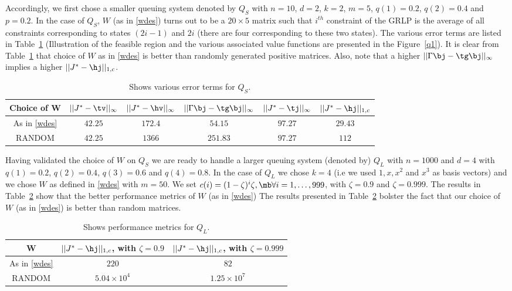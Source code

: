 Accordingly, we first chose a smaller queuing system denoted by $Q_S$ with $n=10$, $d=2$, $k=2$, $m=5$, $q(1)=0.2$, $q(2)=0.4$ and $p=0.2$. In the case of $Q_S$, $W$ (as in \eqref{wdes}) turns out to be a $20 \times 5$ matrix such that $i^{th}$ constraint of the GRLP is the average of all constraints corresponding to states $(2i -1)$ and $2i$ (there are four corresponding to these two states). The various error terms are listed in Table~\ref{errterms} (Illustration of the feasible region and the various associated value functions are presented in the Figure~\ref{q1}). It is clear from Table~\ref{errterms} that choice of $W$ as in \eqref{wdes} is better than randomly generated positive matrices. Also, note that a higher $||\Gamma\bj-\tg\bj||_\infty$ implies a higher $||J^*-\hj||_{1,c}$.
\FloatBarrier
\begin{table}[H]
\begin{tabular}{|c|c|c|c|c|c|}\hline
Choice of W &$||J^*-\tv||_\infty$	&$||J^*-\hv||_\infty$	&$||\Gamma\bj-\tg\bj||_\infty$	&$||J^*-\tj||_\infty$	&$||J^*-\hj||_{1,c}$\\\hline
As in \eqref{wdes}&	$42.25$&	$172.4$&	$54.15$&	$97.27$&		$29.43$\\\hline
RANDOM&	$42.25$&	$1366$&		$251.83$&	$97.27$&	$112$\\\hline
\end{tabular}
\caption{Shows various error terms for $Q_S$.} %
\label{errterms}
\end{table}

\vspace{-10pt}
Having validated the choice of $W$ on $Q_S$ we are ready to handle a larger queuing system (denoted by) $Q_L$ with $n=1000$ and $d=4$ with $q(1)=0.2$, $q(2)=0.4$, $q(3)=0.6$ and $q(4)=0.8$. In the case of $Q_L$ we chose $k=4$ (i.e we used $1, x,x^2$ and $x^3$ as basis vectors) and we chose $W$ as defined in \eqref{wdes} with $m=50$. We set $c(i)=(1-\zeta)^i \zeta, \mb\forall i=1,\ldots,999$, with $\zeta=0.9$ and $\zeta=0.999$. The results in Table~\ref{pref} show that the better performance metrics of $W$ (as in \eqref{wdes})
The results presented in Table~\ref{pref} bolster the fact that our choice of $W$ (as in \eqref{wdes}) is better than random matrices.
\begin{table}
\begin{tabular}{|c|c|c|}\hline
W&	$||J^*-\hj||_{1,c}$, with $\zeta=0.9$ &	$||J^*-\hj||_{1,c}$, with $\zeta=0.999$ \\\hline
As in \eqref{wdes}& $220$&		$82$\\\hline
RANDOM& $5.04\times 10^4$&	$1.25\times 10^7$\\\hline
\end{tabular}
\caption{Shows performance metrics for $Q_L$.}%
\label{pref}
\end{table}
